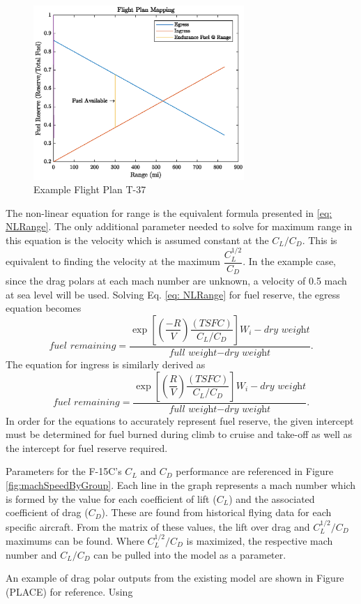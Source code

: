 \begin{figure} 
    \centering
    \includegraphics[width = 8cm]{Thesis/Method/ExampleFlightT37.eps}
    \caption{Example Flight Plan T-37}
    \label{fig:exT37}
\end{figure}
The non-linear equation for range is the equivalent formula presented in \ref{eq: NLRange}. The only additional parameter needed to solve for maximum range in this equation is the velocity which is assumed constant at the $C_L/C_D$. This is equivalent to finding the velocity at the maximum $\dfrac{C_L^{1/2}}{C_D}$. In the example case, since the drag polars at each mach number are unknown, a velocity of 0.5 mach at sea level will be used. Solving Eq. \ref{eq: NLRange} for fuel reserve, the egress equation becomes
\begin{equation}
    \textit{fuel remaining} = \dfrac{\exp\left[\left(\dfrac{-R}{V}\right)\dfrac{(TSFC)}{C_L/C_D}\right]W_i-\textit{dry weight}}{\textit{full weight} - \textit{dry weight}}.
\end{equation}
The equation for ingress is similarly derived as 
\begin{equation}
    \textit{fuel remaining} =\dfrac{\exp\left[\left(\dfrac{R}{V}\right)\dfrac{(TSFC)}{C_L/C_D}\right]W_i-\textit{dry weight}}{\textit{full weight} - \textit{dry weight}}.
\end{equation}
In order for the equations to accurately represent fuel reserve, the given intercept must be determined for fuel burned during climb to cruise and take-off as well as the intercept for fuel reserve required.\par

Parameters for the F-15C's $C_L\text{ and }C_D$ performance are referenced in Figure \ref{fig:machSpeedByGroup}. Each line in the graph represents a mach number which is formed by the value for each coefficient of lift ($C_L$) and the associated coefficient of drag ($C_D$). These are found from historical flying data for each specific aircraft. From the matrix of these values, the lift over drag and $C_L^{1/2}/C_D$ maximums can be found. Where $C_L^{1/2}/C_D$ is maximized, the respective mach number and $C_L/C_D$ can be pulled into the model as a parameter.\par
An example of drag polar outputs from the existing model are shown in Figure (PLACE) for reference. Using 

